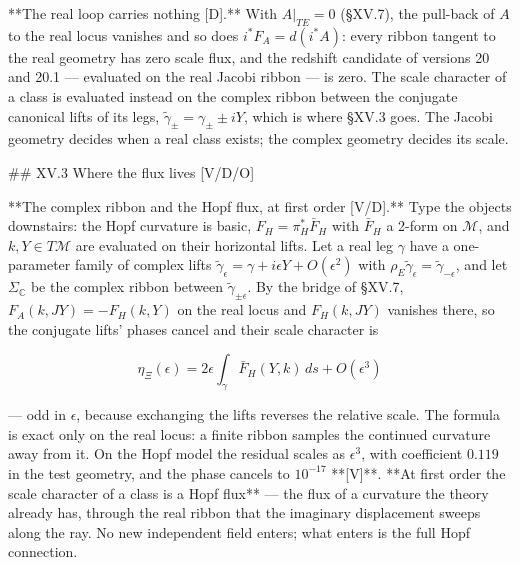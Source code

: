 **The real loop carries nothing [D].** With $A|_{TE} = 0$ (§XV.7), the pull-back of $A$ to the real locus vanishes and so does $i^*F_A = d(i^*A)$: every ribbon tangent to the real geometry has zero scale flux, and the redshift candidate of versions 20 and 20.1 — evaluated on the real Jacobi ribbon — is zero. The scale character of a class is evaluated instead on the complex ribbon between the conjugate canonical lifts of its legs, $\widetilde\gamma_\pm = \gamma_\pm\pm iY$, which is where §XV.3 goes. The Jacobi geometry decides when a real class exists; the complex geometry decides its scale.

## XV.3 Where the flux lives [V/D/O]

**The complex ribbon and the Hopf flux, at first order [V/D].** Type the objects downstairs: the Hopf curvature is basic, $F_H = \pi_H^*\bar F_H$ with $\bar F_H$ a 2-form on $\mathcal M$, and $k,Y\in T\mathcal M$ are evaluated on their horizontal lifts. Let a real leg $\gamma$ have a one-parameter family of complex lifts $\widetilde\gamma_\epsilon = \gamma+i\epsilon Y+O(\epsilon^2)$ with $\rho_E\widetilde\gamma_\epsilon = \widetilde\gamma_{-\epsilon}$, and let $\Sigma_{\mathbb C}$ be the complex ribbon between $\widetilde\gamma_{\pm\epsilon}$. By the bridge of §XV.7, $F_A(k,JY) = -F_H(k,Y)$ on the real locus and $F_H(k,JY)$ vanishes there, so the conjugate lifts' phases cancel and their scale character is

$$\eta_\Xi(\epsilon) = 2\epsilon\int_\gamma\bar F_H(Y,k)\,ds+O(\epsilon^3)$$

— odd in $\epsilon$, because exchanging the lifts reverses the relative scale. The formula is exact only on the real locus: a finite ribbon samples the continued curvature away from it. On the Hopf model the residual scales as $\epsilon^3$, with coefficient $0.119$ in the test geometry, and the phase cancels to $10^{-17}$ **[V]**. **At first order the scale character of a class is a Hopf flux** — the flux of a curvature the theory already has, through the real ribbon that the imaginary displacement sweeps along the ray. No new independent field enters; what enters is the full Hopf connection.

